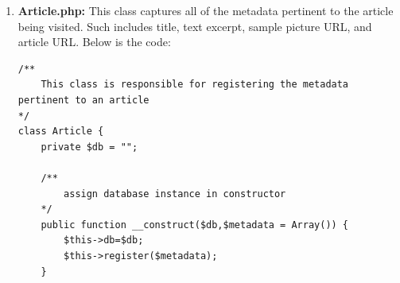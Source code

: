 \documentclass[12pt]{article}
\begin{document}
\begin{enumerate}
\begin{lstlisting}[basicstyle=\tiny]
	/**
		Returns a data array that includes the country of origin, region, ip address, and timezone of visitor.
		The 3rd party API used to extract the data is http://www.telize.com
	*/
	private function getHitData() {
		$remote_addr = $_SERVER["REMOTE_ADDR"];
		$x_forwarded_for = $_SERVER["HTTP_X_FORWARDED_FOR"];
		$data = array();
		
		$url1 = "http://www.telize.com/geoip/" . $remote_addr; 
		$url2 = "http://www.telize.com/geoip/" . $x_forwarded_for; 

		// get the country for the ip behind the first exposed remote address (from www.telize.com)
		if($remote_addr) {
			$results1 = file_get_contents($url1);
			$results1 = json_decode($results1);
			$country1 = $results1->country;
			$region1 = $results1->region;
			$timezone1 = $results1->timezone;
			$ip = $remote_addr;
		}
		
		// get the country for the ip behind the second exposed remote address (from www.telize.com)
		if($x_forwarded_for) {
			$results2 = file_get_contents($url2);
			$results2 = json_decode($results2);
			$country2 = $results2->country;
			$region2 = $results2->region;
			$timezone2 = $results2->timezone;
			$ip = $x_forwarded_for;
		}
		
		// determines the true country of origin, depending on whether the user is behind a proxy server or not
		if(strlen($country1) > 0 && strlen($country2) > 0) {
			$data[0] = $country2;
			$data[1] = $x_forwarded_for;
			$data[2] = $region2;
			$data[3] = $timezone2;
		} else {
			$data[0] = $country1;
			$data[1] = $remote_addr;
			$data[2] = $region1;
			$data[3] = $timezone1;
		}

		// set timezone
		$this->setTimezone($data[3]);
		
		// get timestamp of visit
		$date = new DateTime("NOW");
		$timestamp = $date->format('U');
		$data[4] = $timestamp;
		
		return $data;
	}
}
\end{lstlisting}
\vfill
\item{\textbf{Article.php:}} This class captures all of the metadata pertinent to the article being visited. Such includes title, text excerpt, sample picture URL, and article URL. Below is the code:
\begin{lstlisting}[basicstyle=\tiny]
/**
	This class is responsible for registering the metadata pertinent to an article
*/
class Article {
	private $db = "";
	
	/**
		assign database instance in constructor
	*/
	public function __construct($db,$metadata = Array()) {
		$this->db=$db;
		$this->register($metadata);
	}
	

\end{lstlisting}
\end{enumerate}
\end{document}
